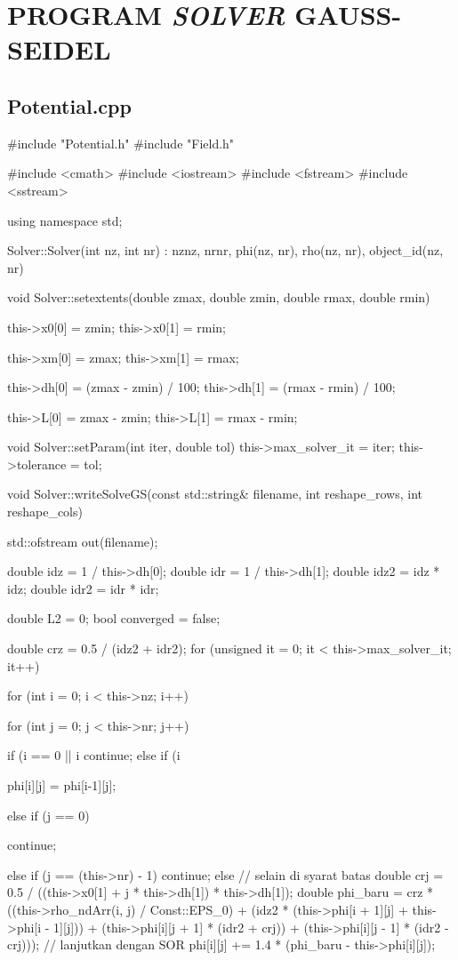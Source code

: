 \chapter{PROGRAM \textit{SOLVER} GAUSS-SEIDEL}
\section{Potential.cpp}\label{kode_potential_cpp}
\begin{lampirancppcode}
#include "Potential.h"
#include "Field.h"

#include <cmath>
#include <iostream>
#include <fstream>
#include <sstream>

using namespace std;

Solver::Solver(int nz, int nr)
    : nz{nz},
      nr{nr},
      phi(nz, nr),
      rho(nz, nr),
      object_id(nz, nr)
{
}

void Solver::setextents(double zmax, double zmin, double rmax, double rmin)
{
    this->x0[0] = zmin;
    this->x0[1] = rmin;

    this->xm[0] = zmax;
    this->xm[1] = rmax;

    this->dh[0] = (zmax - zmin) / 100;
    this->dh[1] = (rmax - rmin) / 100;

    this->L[0] = zmax - zmin;
    this->L[1] = rmax - rmin;
}

void Solver::setParam(int iter, double tol)
{
    this->max_solver_it = iter;
    this->tolerance = tol;
}


void Solver::writeSolveGS(const std::string& filename, int reshape_rows, int reshape_cols) {
    std::ofstream out(filename);

    double idz = 1 / this->dh[0];
    double idr = 1 / this->dh[1];
    double idz2 = idz * idz;
    double idr2 = idr * idr;

    double L2 = 0;
    bool converged = false;

    double crz = 0.5 / (idz2 + idr2);
    for (unsigned it = 0; it < this->max_solver_it; it++)
    {
        for (int i = 0; i < this->nz; i++)
        {
            for (int j = 0; j < this->nr; j++)
            {
                if (i == 0 || i %
                {
                    continue;
                }
                else if (i %
                {

                    phi[i][j] = phi[i-1][j];
                }
                else if (j == 0) 
                {
                    continue; 

                }
                else if (j == (this->nr) - 1) 
                {
                    continue; 
                }
                else // selain di syarat batas
                {
                    double crj = 0.5 / ((this->x0[1] + j * this->dh[1]) * this->dh[1]);
                    double phi_baru = crz * ((this->rho_ndArr(i, j) / Const::EPS_0) + (idz2 * (this->phi[i + 1][j] + this->phi[i - 1][j])) + (this->phi[i][j + 1] * (idr2 + crj)) + (this->phi[i][j - 1] * (idr2 - crj)));
                    // lanjutkan dengan SOR
                    phi[i][j] += 1.4 * (phi_baru - this->phi[i][j]);
                }

}}}}
\end{lampirancppcode}
